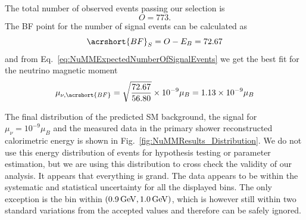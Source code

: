 The total number of observed events passing our selection is
\begin{equation}
O = 773.
\end{equation}
The \gls{BF} point for the number of signal events can be calculated as
\begin{equation}
\acrshort{BF}_S= O-E_B = 72.67
\end{equation}
and from Eq.~\ref{eq:NuMMExpectedNumberOfSignalEvents} we get the best fit for the neutrino magnetic moment
\begin{equation}
\mu_{\nu,\acrshort{BF}} = \sqrt{\frac{72.67}{56.80}} \times 10^{-9}\mu_B = 1.13\times 10^{-9}\mu_B
\end{equation}

The final distribution of the predicted \gls{SM} background, the signal for $\mu_{\nu}=10^{-9}\mu_B$ and the measured data in the primary shower reconstructed calorimetric energy is shown in Fig.~\ref{fig:NuMMResults_Distribution}. We do not use this energy distribution of events for hypothesis testing or parameter estimation, but we are using this distribution to cross check the validity of our analysis. It appears that everything is grand. The data appears to be within the systematic and statistical uncertainty for all the displayed bins. The only exception is the bin within $\left(\unit[0.9]{GeV},\unit[1.0]{GeV}\right)$, which is however still within two standard variations from the accepted values and therefore can be safely ignored.

